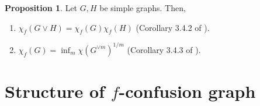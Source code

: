 \documentclass[journal, onecolumn, draftcls]{IEEEtran}
\theoremstyle{definition}
\newtheorem{proposition}{Proposition}
\newcommand{\meng}[1]{\marginpar{+}{\bf Ruoyu's remark}: {\em #1}}
\newcommand{\aditya}[1]{\marginpar{+}{\bf Aditya's remark}: {\em #1}}
\begin{document}
 


 \begin{proposition}  \label{prop:chi_frac}
Let $G,H$ be simple graphs. Then,
\begin{enumerate} [label=(\alph*)]
    \item $\chi_f(G\lor H) = \chi_f(G)\chi_f(H)$ (Corollary 3.4.2 of \cite{ScheinermanU97FGT}).\label{prop:OR_chi_f}
    \item $\chi_f(G) = \inf_m \chi(G^{\lor m})^{1/m}$ (Corollary 3.4.3 of \cite{ScheinermanU97FGT}).\label{prop:OR_Witsenhausen_rate}
\end{enumerate} 
 \end{proposition} 

 
\section{Structure of $f$-confusion graph}
\label{sec:struc_conf_graph} 
\end{document}
